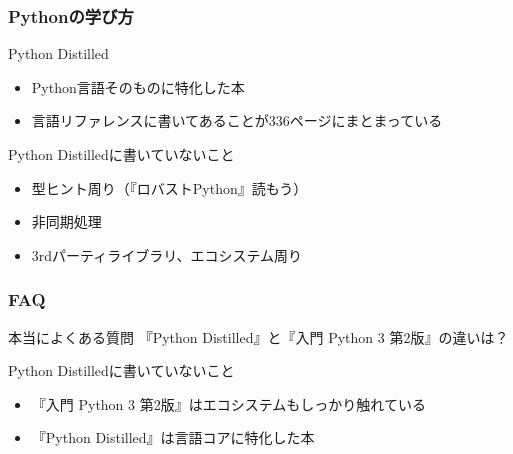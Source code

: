 \documentclass[aspectratio=169,dvipdfmx,12pt,notheorems]{beamer}
\theoremstyle{definition}
\begin{document}
\begin{frame}\frametitle{Pythonの学び方}

\begin{block}{Python Distilled}
\begin{itemize}
\item Python言語そのものに特化した本
\item 言語リファレンスに書いてあることが336ページにまとまっている
\end{itemize}
\end{block}

\begin{alertblock}{Python Distilledに書いていないこと}
\begin{itemize}
\item 型ヒント周り（『ロバストPython』読もう）
\item 非同期処理
\item 3rdパーティライブラリ、エコシステム周り
\end{itemize}
\end{alertblock}

\end{frame}

\begin{frame}\frametitle{FAQ}

\begin{exampleblock}{本当によくある質問}
『Python Distilled』と『入門 Python 3 第2版』の違いは？
\end{exampleblock}

\begin{block}{Python Distilledに書いていないこと}
\begin{itemize}
\item 『入門 Python 3 第2版』はエコシステムもしっかり触れている
\item 『Python Distilled』は言語コアに特化した本
\end{itemize}
\end{block}

\end{frame}
\end{document}
